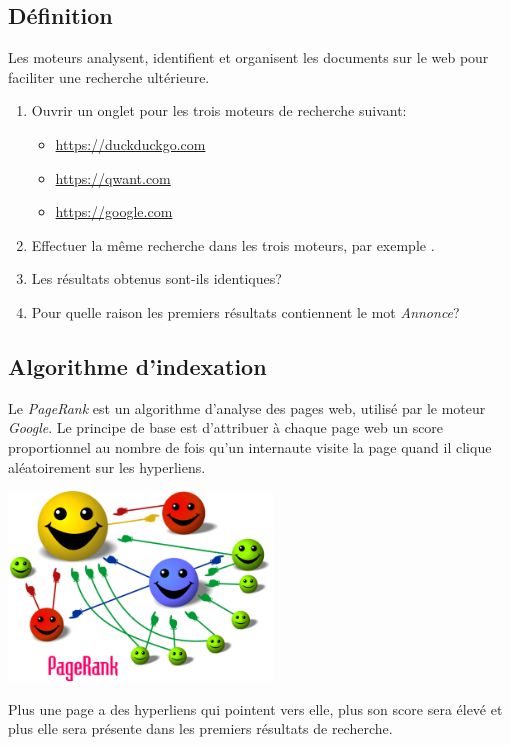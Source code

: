 \documentclass[a4paper,11pt]{article}
\begin{document}
\begin{Form}
\subsection{Définition}
\begin{aretenir}[]
Les moteurs analysent, identifient et organisent les documents sur le web pour faciliter une recherche ultérieure.
\end{aretenir}
\begin{activite}
\begin{enumerate}
\item Ouvrir un onglet pour les trois moteurs de recherche suivant:
\begin{itemize}
\item \url{https://duckduckgo.com}
\item \url{https://qwant.com}
\item \url{https://google.com}
\end{itemize}
\item Effectuer la même recherche dans les trois moteurs, par exemple .
\item Les résultats obtenus sont-ils identiques?
\item Pour quelle raison les premiers résultats contiennent le mot \emph{Annonce}?
\end{enumerate}
\end{activite}
\subsection{Algorithme d'indexation}
Le \emph{PageRank} est un algorithme d'analyse des pages web, utilisé par le moteur \emph{Google}. Le principe de base est d'attribuer à chaque page web un score proportionnel au nombre de fois qu'un internaute visite la page quand il clique aléatoirement sur les hyperliens.
\begin{center}
\centering
\includegraphics[width=7cm]{ressources/pagerank.png}
\label{pagerank}
\end{center}
Plus une page a des hyperliens qui pointent vers elle, plus son score sera élevé et plus elle sera présente dans les premiers résultats de recherche. 
\end{Form}
\end{document}
